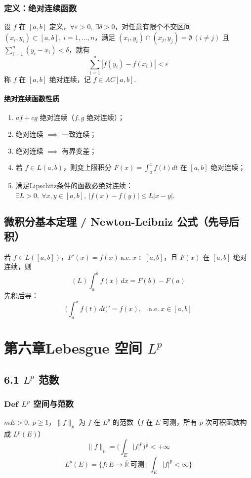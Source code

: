 \documentclass{article}
\begin{document}
	\subsubsection{定义：绝对连续函数}
	设 $f$ 在 $[a,b]$ 定义，$\forall \varepsilon>0,\ \exists \delta>0$，对任意有限个不交区间 $(x_i,y_i)\subset[a,b],\ i=1,\dots,n$，满足 $(x_i,y_i)\cap(x_j,y_j)=\emptyset\ (i\ne j)$ 且 $\displaystyle \sum_{i=1}^n (y_i-x_i)<\delta$，就有
	\[
	\displaystyle \sum_{i=1}^n |f(y_i)-f(x_i)| < \varepsilon
	\]
	称 $f$ 在 $[a,b]$ 绝对连续，记 $f\in AC[a,b]$.
	
	\paragraph{绝对连续函数性质}
	\begin{enumerate}
		\item $af+cg$ 绝对连续（$f,g$ 绝对连续）；
		\item 绝对连续 $\implies$ 一致连续；
		\item 绝对连续 $\implies$ 有界变差；
		\item 若 $f\in L(a,b)$，则变上限积分 $\displaystyle F(x)=\int_a^x f(t)dt$ 在 $[a,b]$ 绝对连续；
		\item 满足Lipschitz条件的函数必绝对连续：$\exists L>0,\ \forall x,y\in[a,b],\ |f(x)-f(y)|\le L|x-y|$.
	\end{enumerate}
	
	\subsection{微积分基本定理 / Newton-Leibniz 公式（先导后积）}
	若 $f\in L([a,b])$，$F'(x)=f(x)\ \text{a.e.}\ x\in[a,b]$，且 $F(x)$ 在 $[a,b]$ 绝对连续，则
	\[
	(L)\int_a^b f(x)\,dx = F(b)-F(a)
	\]
	先积后导：
	\[
	\Big(\int_a^x f(t)\,dt\Big)' = f(x),\quad \text{a.e.}\ x\in[a,b]
	\]
	
	\section{第六章\quad Lebesgue 空间 $L^p$}
	\subsection{6.1 $L^p$ 范数}
	\subsubsection{$\bm{Def}$ $L^p$ 空间与范数}
	$mE>0,\ p\ge1$，$\|f\|_p$ 为 $f$ 在 $L^p$ 的范数（$f$ 在 $E$ 可测，所有 $p$ 次可积函数构成 $L^p(E)$）
	\[
	\|f\|_p = \Big(\int_E |f|^p\Big)^{\frac1p} < +\infty
	\]
	\[
	L^p(E) = \Big\{ f:E\to\overline{\mathbb{R}}\ \text{可测}\ \Big|\ \int_E |f|^p < \infty \Big\}
	\]
	
\end{document}

